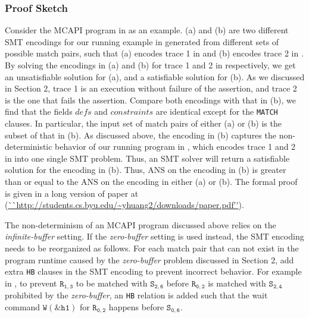\subsubsection{Proof Sketch}
Consider the MCAPI program in  as an example.
(a) and (b) are two different SMT encodings for our running
example in  generated from different sets of possible match pairs, such that (a) encodes trace 1 in  and (b) encodes trace 2 in . By solving the encodings in (a) and (b) for trace 1 and 2 in  respectively, we get an unsatisfiable solution for (a), and a satisfiable solution for (b). As we discussed in Section 2, trace 1 is an execution without failure of the assertion, and trace 2 is the one that fails the assertion. %
Compare both encodings with that in (b), we find that the fields $\mathit{defs}$ and $\mathit{constraints}$ are identical except for the \texttt{MATCH} clauses. In particular, the input set of match pairs of either (a) or (b) is the subset of that in (b). As discussed above, the encoding in (b) captures the non-deterministic behavior of our running program in , which encodes trace 1 and 2 in  into one single SMT problem. Thus, an SMT solver will return a satisfiable solution for the encoding in (b). Thus, $\mathrm{ANS}$ on the encoding in (b) is greater than or equal to the $\mathrm{ANS}$ on the encoding in either (a) or (b). The formal proof is given in a long version of paper at (\url{``http://students.cs.byu.edu/~yhuang2/downloads/paper.pdf''}).

The non-determinism of an MCAPI program discussed above relies on the \textit{infinite-buffer} setting. If the \textit{zero-buffer} setting is used instead, the SMT encoding needs to be reorganized as follows. For each match pair that can not exist in the program runtime caused by the \textit{zero-buffer} problem discussed in Section 2, add extra \texttt{HB} clauses in the SMT encoding to prevent incorrect behavior. For example in , to prevent $\mathtt{R_{1,3}}$ to be matched with $\mathtt{S_{2,6}}$ before $\mathtt{R_{0,2}}$ is matched with $\mathtt{S_{2,4}}$ prohibited by the \textit{zero-buffer}, an \texttt{HB} relation is added such that the wait command $\mathtt{W(\&h1)}$ for $\mathtt{R_{0,2}}$ happens before $\mathtt{S_{0,6}}$.













